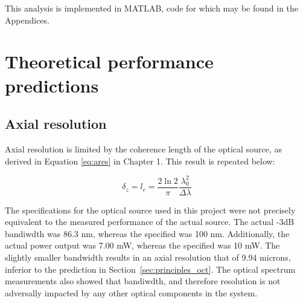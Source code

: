 This analysis is implemented in MATLAB, code for which may be found in the Appendices.

\section{Theoretical performance predictions}
\label{sec:theory_res}

\subsection{Axial resolution}
\label{sec:axial_res}

Axial resolution is limited by the coherence length of the optical source, as derived in Equation \ref{eq:ares} in Chapter 1. This result is repeated below:

\begin{equation} \label{eq:ares2}
\delta_z = l_c = \frac{2 \ln{2}}{\pi} \frac{\lambda_0^2}{\Delta \lambda}
\end{equation}

The specifications for the optical source used in this project were not precisely equivalent to the measured performance of the actual source. The actual -3dB bandiwdth was 86.3 nm, whereas the specified was 100 nm. Additionally, the actual power output was 7.00 mW, whereas the specified was 10 mW. The slightly smaller bandwidth results in an axial resolution that of 9.94 microns, inferior to the prediction in Section~\ref{sec:principles_oct}. The optical spectrum measurements also showed that bandiwdth, and therefore resolution is not adversally impacted by any other optical components in the system. %


